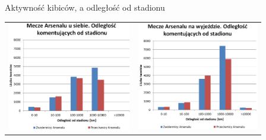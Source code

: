 \documentclass{beamer}
\begin{document}

\begin{frame}{Aktywność kibiców, a odległość od stadionu}
\begin{adjustwidth}{-5cm}{-5cm}
\begin{table}
\begin{tabular}{rl}
\includegraphics[width=5.4cm]{img/odleglosc-od-stadionu-home.png}
&
\includegraphics[width=5.3cm]{img/odleglosc-od-stadionu-away.png}
\end{tabular}
\end{table}
\end{adjustwidth}
\end{frame}
\end{document}
